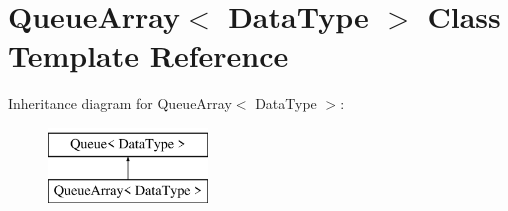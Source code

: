 \hypertarget{class_queue_array}{\section{Queue\+Array$<$ Data\+Type $>$ Class Template Reference}
\label{class_queue_array}
}
Inheritance diagram for Queue\+Array$<$ Data\+Type $>$\+:\begin{figure}[H]
\begin{center}
\leavevmode
\includegraphics[height=2.000000cm]{class_queue_array}
\end{center}
\end{figure}

